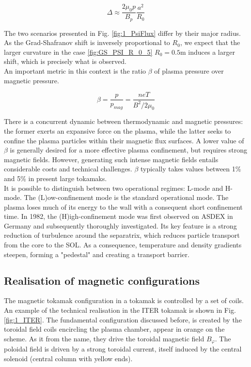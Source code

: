\begin{equation}
	\label{eq:intro_GradShafranovShift}
	\Delta \approx \frac{2\mu_0 p}{B_p}\frac{a^2}{R_0}
\end{equation}

The two scenarios presented in Fig. \ref{fig:1_PsiFlux} differ by their major radius. As the Grad-Shafranov shift is inversely proportional to $R_0$, we expect that the larger curvature in the case \ref{fig:GS_PSI_R_0_5} $R_0 = 0.5$m induces a larger shift, which is precisely what is observed. \\

An important metric in this context is the ratio $\beta$ of plasma pressure over magnetic pressure.

\begin{equation}
	\label{eq:PlasmaBeta}
	\beta = \frac{p}{p_{mag}} = \frac{neT}{B^2/2\mu_0}
\end{equation}

There is a concurrent dynamic between thermodynamic and magnetic pressures: the former exerts an expansive force on the plasma, while the latter seeks to confine the plasma particles within their magnetic flux surfaces. A lower value of $\beta$ is generally desired for a more effective plasma confinement, but requires strong magnetic fields. However, generating such intense magnetic fields entails considerable costs and technical challenges. $\beta$ typically takes values between 1\% and 5\% in present large tokamaks. \\

It is possible to distinguish between two operational regimes: L-mode and H-mode. The (L)ow-confinement mode is the standard operational mode. The plasma loses much of its energy to the wall with a consequent short confinement time. In 1982, the (H)igh-confinement mode was first observed on ASDEX in Germany and subsequently thoroughly investigated\cite{asdex1989h}. Its key feature is a strong reduction of turbulence around the separatrix, which reduces particle transport from the core to the SOL. As a consequence, temperature and density gradients steepen, forming a "pedestal" and creating a transport barrier. 




\subsection{Realisation of magnetic configurations}
\label{ssec:intro_limitedDivertedConfig}

The magnetic tokamak configuration in a tokamak is controlled by a set of coils. An example of the technical realisation in the ITER tokamak is shown in Fig. \ref{fig:1_ITER}. The fundamental configuration discussed before, is created by the toroidal field coils encircling the plasma chamber, appear in orange on the scheme. As it  from the name, they drive the toroidal magnetic field $B_\varphi$. The poloidal field is driven by a strong toroidal current, itself induced by the central solenoid (central column with yellow ends). 


